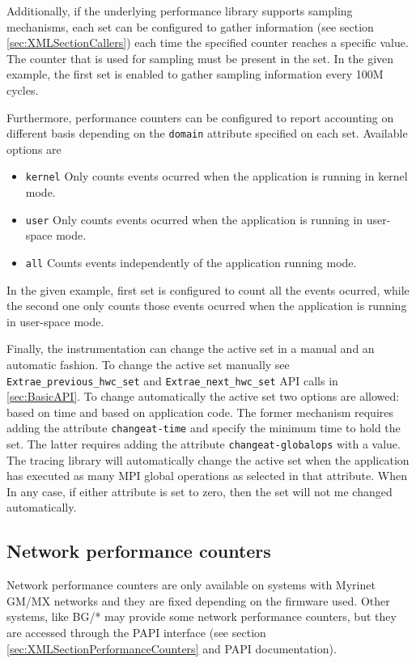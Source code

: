 Additionally, if the underlying performance library supports sampling mechanisms, each set can be configured to gather information (see section \ref{sec:XMLSectionCallers}) each time the specified counter reaches a specific value. The counter that is used for sampling must be present in the set. In the given example, the first set is enabled to gather sampling information every 100M cycles.

Furthermore, performance counters can be configured to report accounting on different basis depending on the {\tt domain} attribute specified on each set. Available options are
\begin{itemize}
 \item {\tt kernel} Only counts events ocurred when the application is running in kernel mode.
 \item {\tt user} Only counts events ocurred when the application is running in user-space mode.
 \item {\tt all} Counts events independently of the application running mode.
\end{itemize}

In the given example, first set is configured to count all the events ocurred, while the second one only counts those events ocurred when the application is running in user-space mode.

Finally, the instrumentation can change the active set in a manual and an automatic fashion. To change the active set manually see {\tt Extrae\_previous\_hwc\_set} and {\tt Extrae\_next\_hwc\_set} API calls in \ref{sec:BasicAPI}. To change automatically the active set two options are allowed: based on time and based on application code. The former mechanism requires adding the attribute {\tt changeat-time} and specify the minimum time to hold the set. The latter requires adding the attribute {\tt changeat-globalops} with a value. The tracing library will automatically change the active set when the application has executed as many MPI global operations as selected in that attribute. When In any case, if either attribute is set to zero, then the set will not me changed automatically.

\subsection{Network performance counters}\label{subsec:NetworkPerformanceCounters}

Network performance counters are only available on systems with Myrinet GM/MX networks and they are fixed depending on the firmware used. Other systems, like BG/* may provide some network performance counters, but they are accessed through the PAPI interface (see section \ref{sec:XMLSectionPerformanceCounters} and {PAPI} documentation).

